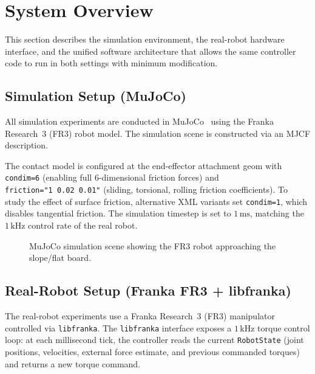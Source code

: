 \documentclass[
	german,%
	accentcolor=9c,%
	ruledheaders=section,%
	class=report,%
	thesis={type=bachelor},%
	fontsize=11pt,%
	parskip=half-,%
	custommargins=true,%
	marginpar=false,%
]{tudapub}
\begin{document}
\section{System Overview}

This section describes the simulation environment, the real-robot hardware
interface, and the unified software architecture that allows the same
controller code to run in both settings with minimum modification.

\subsection{Simulation Setup (MuJoCo)}
\label{sec:mujoco_setup}

All simulation experiments are conducted in MuJoCo~\cite{mujoco} using the
Franka Research~3 (FR3) robot model.
The simulation scene is constructed via an MJCF description\cite{Zakka_MuJoCo_Menagerie_A_2022}.

The contact model is configured at the end-effector attachment geom with
\texttt{condim=6} (enabling full 6-dimensional friction forces) and
\texttt{friction="1~0.02~0.01"} (sliding, torsional, rolling friction
coefficients).
To study the effect of surface friction, alternative XML variants set
\texttt{condim=1}, which disables tangential friction.
The simulation timestep is set to \(1\,\mathrm{ms}\),
matching the \(1\,\mathrm{kHz}\) control rate of the real robot.

\begin{figure}[htbp]
    \centering
    \caption{MuJoCo simulation scene showing the FR3 robot approaching the
             slope/flat board.}
    \label{fig:mujoco_scene}
\end{figure}

\subsection{Real-Robot Setup (Franka FR3 + libfranka)}
\label{sec:real_robot_setup}

The real-robot experiments use a Franka Research~3 (FR3) manipulator
controlled via \texttt{libfranka}.
The \texttt{libfranka} interface exposes a \(1\,\mathrm{kHz}\) torque control
loop: at each millisecond tick, the controller reads the current
\texttt{RobotState} (joint positions, velocities, external force estimate, and
previous commanded torques) and returns a new torque command.
\end{document}
